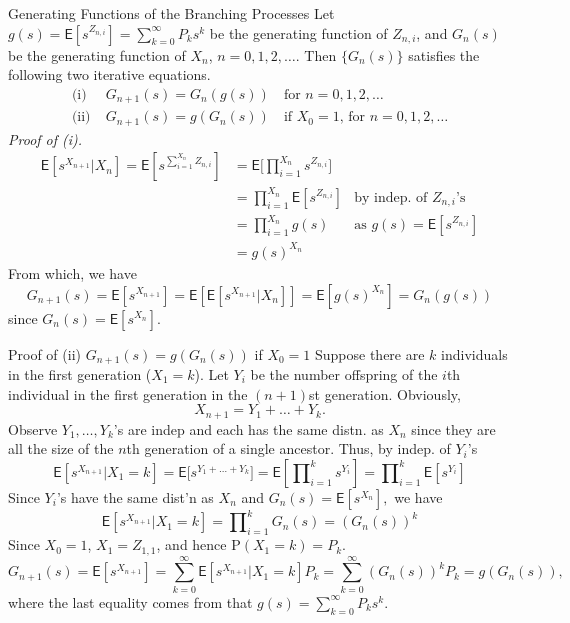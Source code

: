\documentclass[letterpaper, mathserif]{beamer}
\def\p{\mathrm P}
\def\E{\mathsf E}
\def\Prod{\prod\nolimits}
\begin{document}
\begin{frame}{Generating Functions of the Branching Processes}
Let $g(s)=\E[s^{Z_{n,i}}]=\sum_{k=0}^{\infty}P_ks^k$ be the generating function of $Z_{n,i}$, and
$G_n(s)$ be the generating function of $X_n$, $n=0,1,2,\ldots$.
Then $\{G_n(s)\}$ satisfies the following two iterative equations.
\begin{align*}
\text{(i)}  &\; G_{n+1}(s)=G_n(g(s))\quad\text{for }n=0,1,2,\ldots\\
\text{(ii)} &\; G_{n+1}(s)=g(G_n(s))\quad\text{if $X_0=1$, for }n=0,1,2,\ldots
\end{align*}
{\em Proof of (i).}\vspace{-8pt}
\begin{align*}
\E[s^{X_{n+1}}|X_{n}]=\E\left[s^{\sum_{i=1}^{X_{n}}Z_{n,i}}\right]&=\E\Big[\Prod_{i=1}^{X_{n}}s^{Z_{n,i}}\Big]\\
&=\Prod_{i=1}^{X_{n}}\E[s^{Z_{n,i}}]&\text{by indep. of $Z_{n,i}$'s}\\
&=\Prod_{i=1}^{X_{n}}g(s)&\text{as }g(s)=\E[s^{Z_{n,i}}]\\
&=g(s)^{X_{n}}
\end{align*}
From which, we have
$$G_{n+1}(s)=\E[s^{X_{n+1}}]=\E[\E[s^{X_{n+1}}|X_n]]=\E[g(s)^{X_n}]=G_n(g(s))$$
since $G_n(s)=\E[s^{X_{n}}]$.

\end{frame}
\begin{frame}{Proof of (ii) $G_{n+1}(s)=g(G_n(s))$ if $X_0=1$}\small
Suppose there are $k$ individuals in the first generation ($X_1=k$).
Let $Y_i$ be the number offspring of the $i$th individual in the first generation in the $(n+1)$st generation. Obviously,
$$X_{n+1}=Y_1+\ldots+Y_k.$$
Observe $Y_1,\ldots,Y_k$'s are indep and each has the same distn. as $X_n$ since they are all the size of the $n$th generation of a single ancestor. Thus, by indep. of $Y_i$'s
\[
\E[s^{X_{n+1}}|X_{1}=k]=\E\big[s^{Y_1+\ldots+Y_k}\big]=\E\left[\Prod_{i=1}^{k}s^{Y_i}\right]=\Prod_{i=1}^{k}\E[s^{Y_{i}}]
\]
Since $Y_i$'s have the same dist'n as $X_n$ and $G_n(s)=\E[s^{X_{n}}],$ we have
\[\E[s^{X_{n+1}}|X_{1}=k]=\Prod_{i=1}^{k}G_n(s)=(G_n(s))^{k}\]
Since $X_0=1$, $X_1=Z_{1,1}$, and hence $\p(X_1=k)=P_k$.
$$G_{n+1}(s)=\E[s^{X_{n+1}}]
=\sum_{k=0}^{\infty}\E[s^{X_{n+1}}|X_1=k]P_k=\sum_{k=0}^{\infty}(G_n(s))^k P_k=g(G_n(s)),$$
where the last equality comes from that $g(s)=\sum_{k=0}^{\infty}P_k s^k.$
\end{frame}
\end{document}
